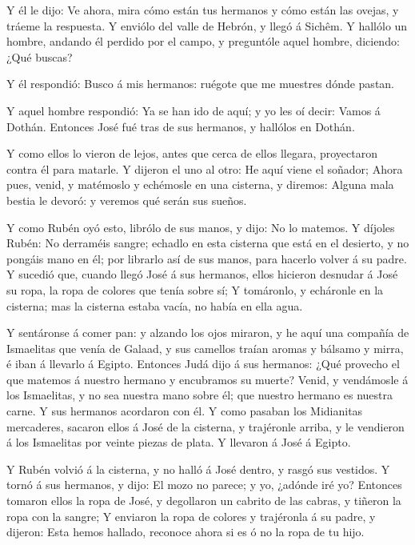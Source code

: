  Y él le dijo: Ve ahora, mira cómo están tus hermanos y
cómo están las ovejas, y tráeme la respuesta. Y enviólo del valle de
Hebrón, y llegó á Sichêm.  Y hallólo un hombre, andando él
perdido por el campo, y preguntóle aquel hombre, diciendo: ¿Qué buscas?

 Y él respondió: Busco á mis hermanos: ruégote que me
muestres dónde pastan.

 Y aquel hombre respondió: Ya se han ido de aquí; y yo les
oí decir: Vamos á Dothán. Entonces José fué tras de sus hermanos, y
hallólos en Dothán.

 Y como ellos lo vieron de lejos, antes que cerca de ellos
llegara, proyectaron contra él para matarle.  Y dijeron el
uno al otro: He aquí viene el soñador;  Ahora pues, venid,
y matémoslo y echémosle en una cisterna, y diremos: Alguna mala bestia
le devoró: y veremos qué serán sus sueños.

 Y como Rubén oyó esto, librólo de sus manos, y dijo: No lo
matemos.  Y díjoles Rubén: No derraméis sangre; echadlo en
esta cisterna que está en el desierto, y no pongáis mano en él; por
librarlo así de sus manos, para hacerlo volver á su padre. 
Y sucedió que, cuando llegó José á sus hermanos, ellos hicieron desnudar
á José su ropa, la ropa de colores que tenía sobre sí;  Y
tomáronlo, y echáronle en la cisterna; mas la cisterna estaba vacía, no
había en ella agua.

 Y sentáronse á comer pan: y alzando los ojos miraron, y he
aquí una compañía de Ismaelitas que venía de Galaad, y sus camellos
traían aromas y bálsamo y mirra, é iban á llevarlo á Egipto.
 Entonces Judá dijo á sus hermanos: ¿Qué provecho el que
matemos á nuestro hermano y encubramos su muerte?  Venid, y
vendámosle á los Ismaelitas, y no sea nuestra mano sobre él; que nuestro
hermano es nuestra carne. Y sus hermanos acordaron con él. 
Y como pasaban los Midianitas mercaderes, sacaron ellos á José de la
cisterna, y trajéronle arriba, y le vendieron á los Ismaelitas por
veinte piezas de plata. Y llevaron á José á Egipto.

 Y Rubén volvió á la cisterna, y no halló á José dentro, y
rasgó sus vestidos.  Y tornó á sus hermanos, y dijo: El
mozo no parece; y yo, ¿adónde iré yo?  Entonces tomaron
ellos la ropa de José, y degollaron un cabrito de las cabras, y tiñeron
la ropa con la sangre;  Y enviaron la ropa de colores y
trajéronla á su padre, y dijeron: Esta hemos hallado, reconoce ahora si
es ó no la ropa de tu hijo.

